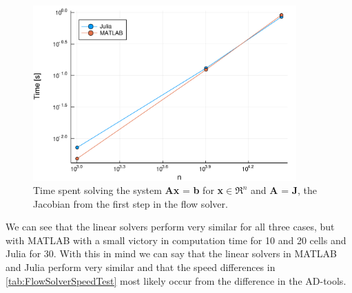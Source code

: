 \begin{figure}[htbp]
    \centering
    \includegraphics[width = 0.9\textwidth]{figures/benchmark_linear_solvers.pdf}
    \caption{Time spent solving the system \textbf{Ax} = \textbf{b} for \textbf{x}$\in\Re^{n}$ and \textbf{A} = \textbf{J}, the Jacobian from the first step in the flow solver.}
    \label{fig:benchmarkLinearSolver}
\end{figure}
We can see that the linear solvers perform very similar for all three cases, but with MATLAB with a small victory in computation time for 10 and 20 cells and Julia for 30. With this in mind we can say that the linear solvers in MATLAB and Julia perform very similar and that the speed differences in \autoref{tab:FlowSolverSpeedTest} most likely occur from the difference in the AD-tools.